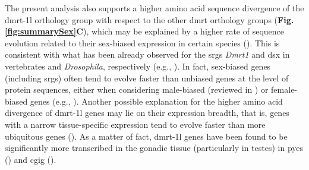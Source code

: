 The present analysis also supports a higher amino acid sequence divergence of the \gls{dmrt-1l} orthology group with respect to the other \gls{dmrt} orthology groups (\textbf{Fig. \ref{fig:summarySex}C}), which may be explained by a higher rate of sequence evolution related to their sex-biased expression in certain species (\textbf{\cite{zhang2014genomic,shi2015novo,li2018foxl2,evensen2022comparative}}). This is consistent with what has been already observed for the \glspl{srg} \textit{Dmrt1} and \gls{dsx} in vertebrates and \textit{Drosophila}, respectively (e.g., \textbf{\cite{bewick2011evolution,baral2019genetic}}). In fact, sex-biased genes (including \glspl{srg}) often tend to evolve faster than unbiased genes at the level of protein sequences, either when considering male-biased (reviewed in \textbf{\cite{parsch2013evolutionary,grath2016sex}}) or female-biased genes (e.g., \textbf{\cite{papa2017anopheles,ghiselli2018comparative}}). Another possible explanation for the higher amino acid divergence of \gls{dmrt-1l} genes may lie on their expression breadth, that is, genes with a narrow tissue-specific expression tend to evolve faster than more ubiquitous genes (\textbf{\cite{parsch2013evolutionary,xu2022multi}}). As a matter of fact, \gls{dmrt-1l} genes have been found to be significantly more transcribed in the gonadic tissue (particularly in testes) in \gls{pyes} (\textbf{\cite{li2018foxl2}}) and \gls{cgig} (\textbf{\cite{yue2021variance}}).

